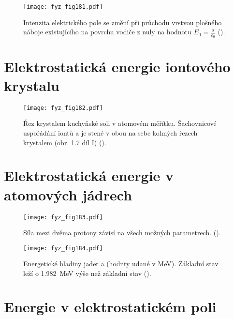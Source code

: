   \begin{figure}[ht!]  %
    \centering
    \texttt{[image: fyz\_fig181.pdf]}
    \caption{Intenzita elektrického pole se změní při průchodu vrstvou plošného náboje existujícího 
             na povrchu vodiče z nuly na hodnotu \(E_0 = \frac{\sigma}{\varepsilon_0}\)
             (\cite[s.~145]{Feynman02}).}
    \label{fyz:fig181}
  \end{figure}
  
\section{Elektrostatická energie iontového krystalu}\label{fyz:IIchapVIsecIII}

  \begin{figure}[ht!]  %
    \centering
    \texttt{[image: fyz\_fig182.pdf]}
    \caption{Řez krystalem kuchyňské soli v atomovém měřítku. Šachovnicové uspořádání iontů  
             a  je stené v obou na sebe kolmých řezech krystalem (obr. 1.7 díl I)
             (\cite[s.~146]{Feynman02}).}
    \label{fyz:fig182}
  \end{figure}

\section{Elektrostatická energie v atomových jádrech}\label{fyz:IIchapVIsecIV}

  \begin{figure}[ht!]  %
    \centering
    \texttt{[image: fyz\_fig183.pdf]}
    \caption{Síla mezi dvěma protony závisí na všech možných parametrech. 
             (\cite[s.~148]{Feynman02}).}
    \label{fyz:fig183}
  \end{figure}

  \begin{figure}[ht!]  %
    \centering
    \texttt{[image: fyz\_fig184.pdf]}
    \caption{Energetické hladiny jader  a  (hodnty udané v 
             \si{\mega\electronvolt}). Základní stav  leží o 
             \SI{1.982}{\mega\electronvolt} výše než základní stav 
             (\cite[s.~149]{Feynman02}).}
    \label{fyz:fig184}
  \end{figure}
  
\section{Energie v elektrostatickém poli}\label{fyz:IIchapVIsecV}

